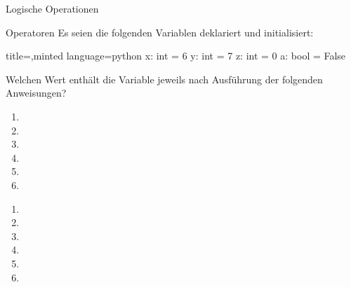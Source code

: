 \begin{task}[points=auto]{Logische Operationen }
    \begin{subtask*}[points=0]{Operatoren}
        Es seien die folgenden Variablen deklariert und initialisiert:
        \begin{codeBlock}[]{title=,minted language=python}
            x: int = 6
            y: int = 7
            z: int = 0
            a: bool = False
        \end{codeBlock}
        Welchen Wert enthält die Variable  jeweils nach Ausführung der folgenden Anweisungen?
        \begin{enumerate}
            \item {}
            \item {}
            \item {}
            \item {}
            \item {}
            \item {}
        \end{enumerate}

        \begin{solution}
            \begin{multicols}{3}
                \begin{enumerate}
                    \item {}
                    \item {}
                    \item {}
                    \item {}
                    \item {}
                    \item {}
                \end{enumerate}
            \end{multicols}
        \end{solution}
    \end{subtask*}
\end{task}
